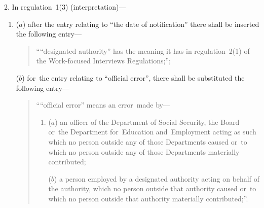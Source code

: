\documentclass[12pt,a4paper]{article}
\begin{document}
2.  In regulation~1(3) (interpretation)—
\begin{enumerate}\item[]
($a$) after the entry relating to “the date of notification” there shall be inserted the following entry—
\begin{quotation}
    ““designated authority” has the meaning it has in regulation~2(1) of the Work-focused Interviews Regulations;”; 
\end{quotation}

($b$) for~the entry relating to “official error”, there shall be substituted the following entry—
\begin{quotation}
    ““official error” means an error~made by—
\begin{enumerate}\item[]
    ($a$) 
    an officer of the Department of Social Security, the Board or~the Department for~Education and~Employment acting as such which no person outside any of those Departments caused or~to which no person outside any of those Departments materially contributed;

    ($b$) 
    a person employed by a designated authority acting on behalf of the authority, which no person outside that authority caused or~to which no person outside that authority materially contributed;”.
\end{enumerate}
\end{quotation}
%
%
\end{enumerate}


\medskip
\end{document}
